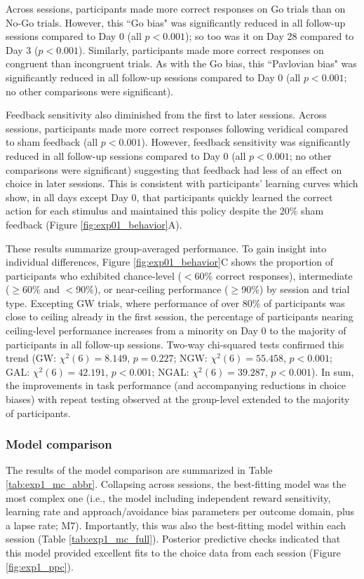 \documentclass[a4paper,12pt]{article}
\begin{document}
\begin{refsection}[main]
Across sessions, participants made more correct responses on Go trials than on No-Go trials. However, this ``Go bias" was significantly reduced in all follow-up sessions compared to Day 0 (all $p < 0.001$); so too was it on Day 28 compared to Day 3 ($p < 0.001$). Similarly, participants made more correct responses on congruent than incongruent trials. As with the Go bias, this ``Pavlovian bias" was significantly reduced in all follow-up sessions compared to Day 0 (all $p < 0.001$; no other comparisons were significant). 

Feedback sensitivity also diminished from the first to later sessions. Across sessions, participants made more correct responses following veridical compared to sham feedback (all $p < 0.001$). However, feedback sensitivity was significantly reduced in all follow-up sessions compared to Day 0 (all $p < 0.001$; no other comparisons were significant) suggesting that feedback had less of an effect on choice in later sessions. This is consistent with participants' learning curves which show, in all days except Day 0, that participants quickly learned the correct action for each stimulus and maintained this policy despite the 20\% sham feedback (Figure \ref{fig:exp01_behavior}A).

These results summarize group-averaged performance. To gain insight into individual differences, Figure \ref{fig:exp01_behavior}C shows the proportion of participants who exhibited chance-level ($<$60\% correct responses), intermediate ($\geq$60\% and $<$90\%), or near-ceiling performance ($\geq$90\%) by session and trial type. Excepting GW trials, where performance of over 80\% of participants was close to ceiling already in the first session, the percentage of participants nearing ceiling-level performance increases from a minority on Day 0 to the majority of participants in all follow-up sessions. Two-way chi-squared tests confirmed this trend (GW: $\chi^2 (6) = 8.149$, $p = 0.227$; NGW: $\chi^2 (6) = 55.458$, $p < 0.001$; GAL: $\chi^2 (6) = 42.191$, $p < 0.001$; NGAL: $\chi^2 (6) = 39.287$, $p < 0.001$). In sum, the improvements in task performance (and accompanying reductions in choice biases) with repeat testing observed at the group-level extended to the majority of participants. 

\subsubsection*{Model comparison}

The results of the model comparison are summarized in Table \ref{tab:exp1_mc_abbr}. Collapsing across sessions, the best-fitting model was the most complex one (i.e., the model including independent reward sensitivity, learning rate and approach/avoidance bias parameters per outcome domain, plus a lapse rate; M7). Importantly, this was also the best-fitting model within each session (Table \ref{tab:exp1_mc_full}). Posterior predictive checks indicated that this model provided excellent fits to the choice data from each session (Figure \ref{fig:exp1_ppc}). 


\end{refsection}
\end{document}
